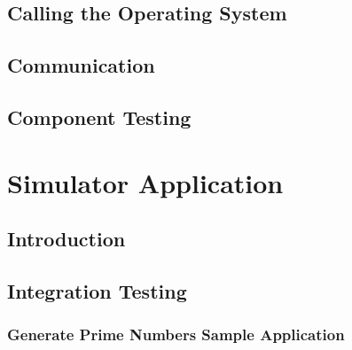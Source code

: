 \documentclass[a4paper,11pt]{report}
\begin{document}
\section{Calling the Operating System}
\section{Communication}
\section{Component Testing}
\chapter{Simulator Application}
\section{Introduction}
\section{Integration Testing}
\subsection{Generate Prime Numbers Sample Application}
\end{document}
